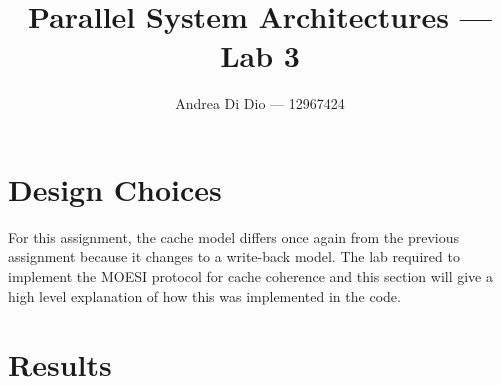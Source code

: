 \documentclass[]{article}
\title{Parallel System Architectures --- Lab 3}
\author{Andrea Di Dio --- 12967424}
\begin{document}
\maketitle

\section{Design Choices}

For this assignment, the cache model differs once again from the previous assignment because it changes to a write-back model. The lab required to implement the MOESI protocol for cache coherence and this section will give a high level explanation of how this was implemented in the code.

\section{Results}
\end{document}
